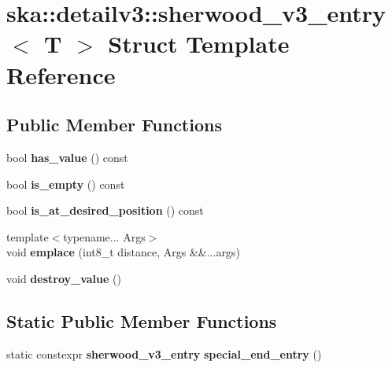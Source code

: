 \section{ska\+:\+:detailv3\+:\+:sherwood\+\_\+v3\+\_\+entry$<$ T $>$ Struct Template Reference}
\label{structska_1_1detailv3_1_1sherwood__v3__entry}
\subsection*{Public Member Functions}
\begin{DoxyCompactItemize}
\item 
bool {\bfseries has\+\_\+value} () const \label{structska_1_1detailv3_1_1sherwood__v3__entry_a53f9b3008914c24416f64b9937c3d0fd}

\item 
bool {\bfseries is\+\_\+empty} () const \label{structska_1_1detailv3_1_1sherwood__v3__entry_a0eb0d934dbde00308e7d8014885b61b1}

\item 
bool {\bfseries is\+\_\+at\+\_\+desired\+\_\+position} () const \label{structska_1_1detailv3_1_1sherwood__v3__entry_a1950ca39fa2f0a8f4dda74764bec4bc5}

\item 
{\footnotesize template$<$typename... Args$>$ }\\void {\bfseries emplace} (int8\+\_\+t distance, Args \&\&...args)\label{structska_1_1detailv3_1_1sherwood__v3__entry_a4be6865af06400fcb96f05a28557c0ba}

\item 
void {\bfseries destroy\+\_\+value} ()\label{structska_1_1detailv3_1_1sherwood__v3__entry_ad2e9db052a3337dcb564c846238145b8}

\end{DoxyCompactItemize}
\subsection*{Static Public Member Functions}
\begin{DoxyCompactItemize}
\item 
static constexpr {\bf sherwood\+\_\+v3\+\_\+entry} {\bfseries special\+\_\+end\+\_\+entry} ()\label{structska_1_1detailv3_1_1sherwood__v3__entry_aeb717d010239337a2056e3fa5e64e7ef}

\end{DoxyCompactItemize}
